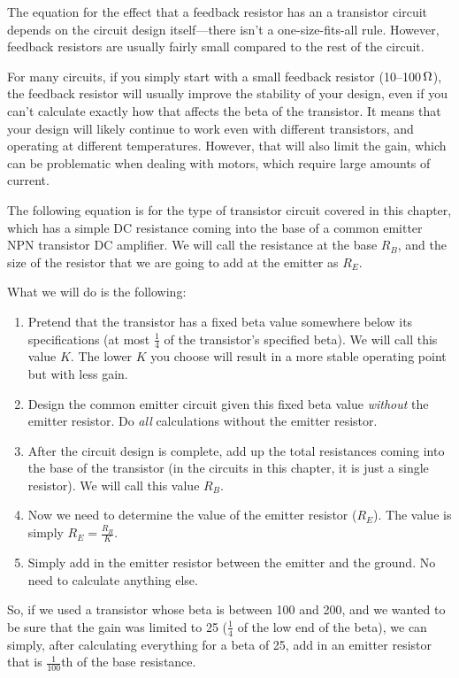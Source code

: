 The equation for the effect that a feedback resistor has an a transistor circuit depends on the circuit design itself---there isn't a one-size-fits-all rule.
However, feedback resistors are usually fairly small compared to the rest of the circuit.

For many circuits, if you simply start with a small feedback resistor (10--100$\,\si{\ohm}$), the feedback resistor will usually improve the stability of your design, even if you can't calculate exactly how that affects the beta of the transistor.  
It means that your design will likely continue to work even with different transistors, and operating at different temperatures.
However, that will also limit the gain, which can be problematic when dealing with motors, which require large amounts of current.

\iffalse
The following equation is for the type of transistor circuit covered in this chapter, which has a simple DC resistance coming into the base of a common emitter NPN transistor DC amplifier.
We will call the resistance at the base $R_B$, and the size of the resistor that we are going to add at the emitter as $R_E$.

What we will do is the following:
\begin{enumerate}
\item Pretend that the transistor has a fixed beta value somewhere below its specifications (at most $\frac{1}{4}$ of the transistor's specified beta).  We will call this value $K$.  The lower $K$ you choose will result in a more stable operating point but with less gain.
\item Design the common emitter circuit given this fixed beta value \emph{without} the emitter resistor.  Do \emph{all} calculations without the emitter resistor.
\item After the circuit design is complete, add up the total resistances coming into the base of the transistor (in the circuits in this chapter, it is just a single resistor).  We will call this value $R_B$.
\item Now we need to determine the value of the emitter resistor ($R_E$).  The value is simply $R_E = \frac{R_B}{K}$.
\item Simply add in the emitter resistor between the emitter and the ground.  No need to calculate anything else.
\end{enumerate}

So, if we used a transistor whose beta is between 100 and 200, and we wanted to be sure that the gain was limited to 25 ($\frac{1}{4}$ of the low end of the beta), we can simply, after calculating everything for a beta of 25, add in an emitter resistor that is $\frac{1}{100}$th of the base resistance.

